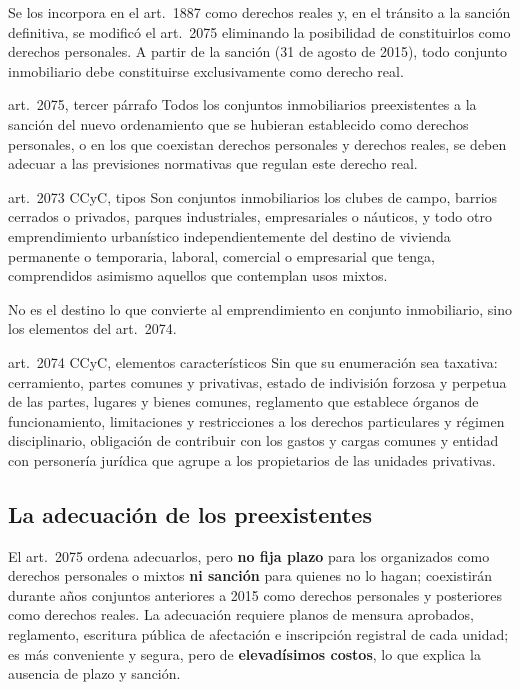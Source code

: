 \documentclass[12pt,oneside]{book}
\begin{document}
Se los incorpora en el art.~1887 como derechos reales y, en el tránsito a la sanción definitiva, se modificó el art.~2075 eliminando la posibilidad de constituirlos como derechos personales. A partir de la sanción (31 de agosto de 2015), todo conjunto inmobiliario debe constituirse exclusivamente como derecho real. %

\begin{regla}{art.~2075, tercer párrafo}
Todos los conjuntos inmobiliarios preexistentes a la sanción del nuevo ordenamiento que se hubieran establecido como derechos personales, o en los que coexistan derechos personales y derechos reales, se deben adecuar a las previsiones normativas que regulan este derecho real.
\end{regla}

\begin{regla}{art.~2073 CCyC, tipos}
Son conjuntos inmobiliarios los clubes de campo, barrios cerrados o privados, parques industriales, empresariales o náuticos, y todo otro emprendimiento urbanístico independientemente del destino de vivienda permanente o temporaria, laboral, comercial o empresarial que tenga, comprendidos asimismo aquellos que contemplan usos mixtos.
\end{regla}

No es el destino lo que convierte al emprendimiento en conjunto inmobiliario, sino los elementos del art.~2074.

\begin{regla}{art.~2074 CCyC, elementos característicos}
Sin que su enumeración sea taxativa: cerramiento, partes comunes y privativas, estado de indivisión forzosa y perpetua de las partes, lugares y bienes comunes, reglamento que establece órganos de funcionamiento, limitaciones y restricciones a los derechos particulares y régimen disciplinario, obligación de contribuir con los gastos y cargas comunes y entidad con personería jurídica que agrupe a los propietarios de las unidades privativas.
\end{regla}

\subsection{La adecuación de los preexistentes}

El art.~2075 ordena adecuarlos, pero \textbf{no fija plazo} para los organizados como derechos personales o mixtos \textbf{ni sanción} para quienes no lo hagan; coexistirán durante años conjuntos anteriores a 2015 como derechos personales y posteriores como derechos reales. La adecuación requiere planos de mensura aprobados, reglamento, escritura pública de afectación e inscripción registral de cada unidad; es más conveniente y segura, pero de \textbf{elevadísimos costos}, lo que explica la ausencia de plazo y sanción.
\end{document}
